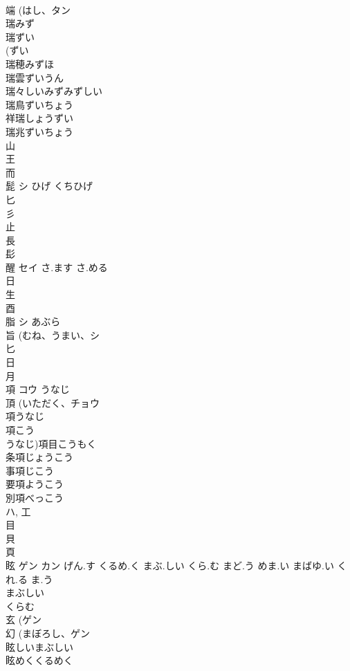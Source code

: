 \documentclass[8pt]{extreport}
\begin{document}
\begin{CJK}{UTF8}{min}
\\	端 (はし、タン 
\\	瑞みず 
\\	瑞ずい 
\\	(ずい 
\\	瑞穂みずほ 
\\	瑞雲ずいうん 
\\	瑞々しいみずみずしい 
\\	瑞鳥ずいちょう 
\\	祥瑞しょうずい 
\\	瑞兆ずいちょう 
\\	山 
\\	王 
\\	而 
\\	髭	シ	ひげ くちひげ	
\\	匕 
\\	彡 
\\	止 
\\	長 
\\	髟 
\\	醒	セイ	さ.ます さ.める	
\\	日 
\\	生 
\\	酉 
\\	脂	シ	あぶら	
\\	旨 (むね、うまい、シ 
\\	匕 
\\	日 
\\	月 
\\	項	コウ	うなじ	
\\	頂 (いただく、チョウ 
\\	項うなじ
\\	項こう
\\	うなじ)項目こうもく
\\	条項じょうこう
\\	事項じこう
\\	要項ようこう
\\	別項べっこう
\\	ハ, 工 
\\	目 
\\	貝 
\\	頁 
\\	眩	ゲン カン	げん.す くるめ.く まぶ.しい くら.む まど.う めま.い まばゆ.い くれ.る ま.う	
\\	まぶしい 
\\	くらむ 
\\	玄 (ゲン 
\\	幻 (まぼろし、ゲン 
\\	眩しいまぶしい
\\	眩めくくるめく

\end{CJK}
\end{document}
